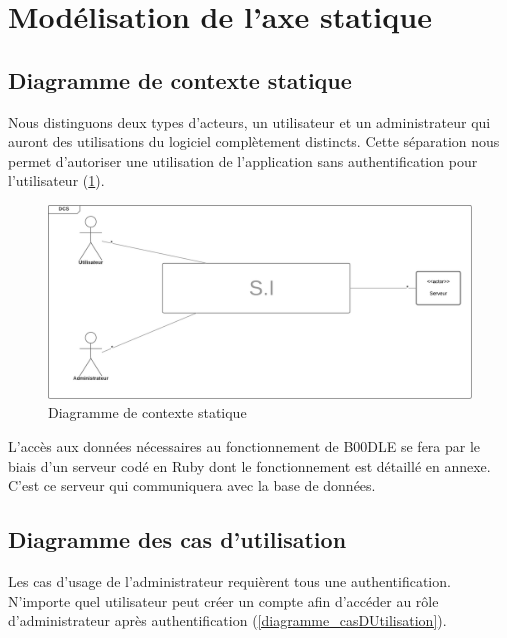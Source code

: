 \documentclass[titlepage]{report}
\begin{document}
\section{Modélisation de l'axe statique}

\subsection{Diagramme de contexte statique}

Nous distinguons deux types d'acteurs, un utilisateur et un administrateur qui auront des utilisations du logiciel complètement distincts. 
Cette séparation nous permet d'autoriser une utilisation de l'application sans authentification pour l'utilisateur (\ref{diagramme_contexteStatique}). 

\begin{figure}[h]
	\caption{Diagramme de contexte statique}
	\label{diagramme_contexteStatique}
	\centering
	\includegraphics[width=\textwidth]{figures/diagrammes/contexteStatique.png}
\end{figure}

L'accès aux données nécessaires au fonctionnement de B00DLE se fera par le biais d'un serveur codé en Ruby dont le fonctionnement est détaillé en annexe. C'est ce serveur qui communiquera avec la base de données.

\subsection{Diagramme des cas d'utilisation}

\par Les cas d'usage de l'administrateur requièrent tous une authentification. N'importe quel utilisateur peut créer un compte afin d'accéder au rôle d'administrateur après authentification (\ref{diagramme_casDUtilisation}).
\end{document}

